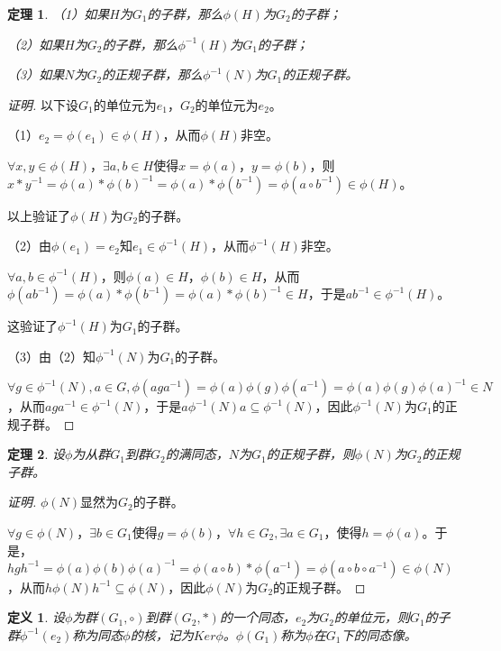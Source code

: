\documentclass{article}
\newtheorem{Def}{定义}
\newtheorem{Thm}{定理}
\begin{document}
\begin{CJK*}{UTF8}{gbsn}
\begin{Thm}
  （1）如果$H$为$G_1$的子群，那么$\phi(H)$为$G_2$的子群；

  （2）如果$H$为$G_2$的子群，那么$\phi^{-1}(H)$为$G_1$的子群；

  （3）如果$N$为$G_2$的正规子群，那么$\phi^{-1}(N)$为$G_1$的正规子群。
\end{Thm}
\begin{proof}[证明]
  以下设$G_1$的单位元为$e_1$，$G_2$的单位元为$e_2$。

  （1）$e_2=\phi(e_1)\in \phi(H)$，从而$\phi(H)$非空。

  $\forall x, y\in \phi(H)$，$\exists a,b\in H$使得$x=\phi(a)$，$y=\phi(b)$，则$x*y^{-1}=\phi(a)*\phi(b)^{-1}=\phi(a)*\phi(b^{-1})=\phi(a\circ b^{-1})\in \phi(H)$。

  以上验证了$\phi(H)$为$G_2$的子群。

  （2）由$\phi(e_1)=e_2$知$e_1\in \phi^{-1}(H)$，从而$\phi^{-1}(H)$非空。

  $\forall a,b\in \phi^{-1}(H)$，则$\phi(a)\in H$，$\phi(b)\in H$，从而$\phi(ab^{-1})=\phi(a)*\phi(b^{-1})=\phi(a)*\phi(b)^{-1}\in H$，于是$ab^{-1}\in \phi^{-1}(H)$。

  这验证了$\phi^{-1}(H)$为$G_1$的子群。

  （3）由（2）知$\phi^{-1}(N)$为$G_1$的子群。

  $\forall g\in \phi^{-1}(N), a\in G, \phi(aga^{-1})=\phi(a)\phi(g)\phi(a^{-1})=\phi(a)\phi(g)\phi(a)^{-1}\in N$，从而$aga^{-1}\in \phi^{-1}(N)$，于是$a\phi^{-1}(N)a\subseteq \phi^{-1}(N)$，因此$\phi^{-1}(N)$为$G_1$的正规子群。
\end{proof}
\begin{Thm}
设$\phi$为从群$G_1$到群$G_2$的满同态，$N$为$G_1$的正规子群，则$\phi(N)$为$G_2$的正规子群。
\end{Thm}
\begin{proof}[证明]
  $\phi(N)$显然为$G_2$的子群。

  $\forall g\in \phi(N)$，$\exists b\in G_1$使得$g=\phi(b)$，$\forall h\in G_2,\exists a\in G_1$，使得$h=\phi(a)$。于是，$hgh^{-1}=\phi(a)\phi(b)\phi(a)^{-1}=\phi(a\circ b)*\phi(a^{-1})=\phi(a\circ b\circ a^{-1})\in \phi(N)$，从而$h\phi(N)h^{-1}\subseteq \phi(N)$，因此$\phi(N)$为$G_2$的正规子群。
\end{proof}
\begin{Def}
设$\phi$为群$(G_1,\circ)$到群$(G_2,*)$的一个同态，$e_2$为$G_2$的单位元，则$G_1$的子群$\phi^{-1}(e_2)$称为同态$\phi$的核，记为$Ker \phi$。$\phi(G_1)$称为$\phi$在$G_1$下的同态像。
\end{Def}


\end{CJK*}
\end{document}
